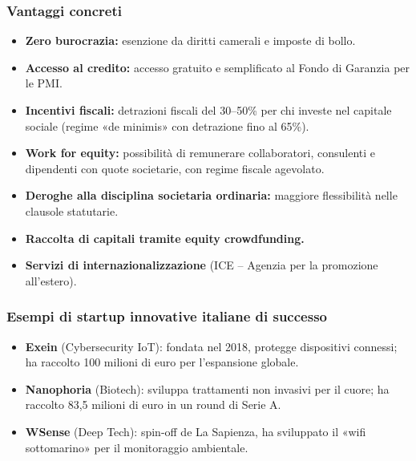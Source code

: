\documentclass[a4paper,12pt]{article}
\begin{document}
	\subsubsection{Vantaggi concreti}
	
	\begin{itemize}
		\item \textbf{Zero burocrazia:} esenzione da diritti camerali e imposte di bollo.
		\item \textbf{Accesso al credito:} accesso gratuito e semplificato al Fondo di Garanzia per le PMI.
		\item \textbf{Incentivi fiscali:} detrazioni fiscali del 30--50\% per chi investe nel capitale sociale (regime «de minimis» con detrazione fino al 65\%).
		\item \textbf{Work for equity:} possibilità di remunerare collaboratori, consulenti e dipendenti con quote societarie, con regime fiscale agevolato.
		\item \textbf{Deroghe alla disciplina societaria ordinaria:} maggiore flessibilità nelle clausole statutarie.
		\item \textbf{Raccolta di capitali tramite equity crowdfunding.}
		\item \textbf{Servizi di internazionalizzazione} (ICE -- Agenzia per la promozione all'estero).
	\end{itemize}
	
	\subsubsection{Esempi di startup innovative italiane di successo}
	
	\begin{itemize}
		\item \textbf{Exein} (Cybersecurity IoT): fondata nel 2018, protegge dispositivi connessi; ha raccolto 100 milioni di euro per l'espansione globale.
		\item \textbf{Nanophoria} (Biotech): sviluppa trattamenti non invasivi per il cuore; ha raccolto 83,5 milioni di euro in un round di Serie A.
		\item \textbf{WSense} (Deep Tech): spin-off de La Sapienza, ha sviluppato il «wifi sottomarino» per il monitoraggio ambientale.
	\end{itemize}
	
\end{document}
